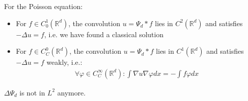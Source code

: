 \begin{theorem}
For the Poisson equation:
\begin{itemize}
	\item For $f \in C_0^1(\mathbb{R}^d)$, the convolution $u = \Psi_d * f$ lies in $C^2(\mathbb{R}^d)$ and satisfies $-\Delta u = f$, i.e. we have found a classical solution
	\item For $f \in C_C^0(\mathbb{R}^d)$, the convolution $u = \Psi_d * f$ lies in $C^1(\mathbb{R}^d)$ and satisfies $-\Delta u= f$ weakly, i.e.:
	\begin{align*}
		\forall \varphi \in C^\infty_C(\mathbb{R}^d): \int \nabla u \nabla \varphi dx = -\int f \varphi dx
	\end{align*}
\end{itemize}
\end{theorem}
\begin{remark}
$\Delta \Psi_d$ is not in $L^2$ anymore.	
\end{remark}

